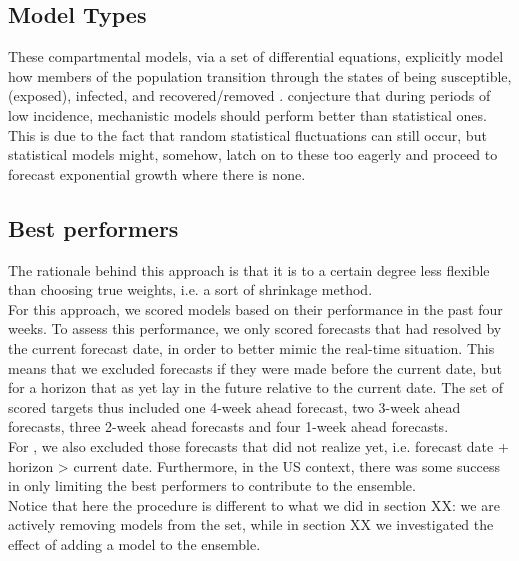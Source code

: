 \subsection{Model Types}
These compartmental models, via a set of differential equations, explicitly model how members of the population transition through the states of being susceptible, (exposed), infected, and recovered/removed \cite{taylor_combining_2021}.
\cite{taylor_combining_2021} conjecture that during periods of low incidence, mechanistic models should perform better than statistical ones. This is due to the fact that random statistical fluctuations can still occur, but statistical models might, somehow, latch on to these too eagerly and proceed to forecast exponential growth where there is none.
\subsection{Best performers}
The rationale behind this approach is that it is to a certain degree less flexible than choosing true weights, i.e. a sort of shrinkage method.\\
For this approach, we scored models based on their performance in the past four weeks. To assess this performance, we only scored forecasts that had resolved by the current forecast date, in order to better mimic the real-time situation. This means that we excluded forecasts if they were made before the current date, but for a horizon that as yet lay in the future relative to the current date. The set of scored targets thus included one 4-week ahead forecast, two 3-week ahead forecasts, three 2-week ahead forecasts and four 1-week ahead forecasts.\\
For , we also excluded those forecasts that did not realize yet, i.e. forecast date + horizon > current date.
Furthermore, in the US context, there was some success in only limiting the best performers to contribute to the ensemble.\\
Notice that here the procedure is different to what we did in section XX: we are actively removing models from the set, while in section XX we investigated the effect of adding a model to the ensemble.
